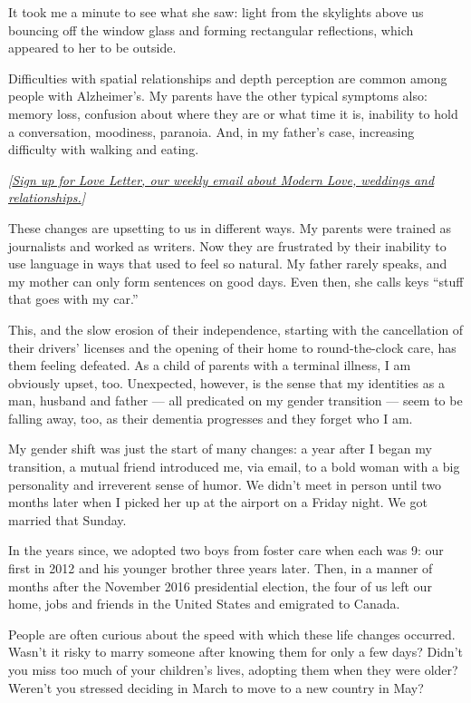It took me a minute to see what she saw: light from the skylights above
us bouncing off the window glass and forming rectangular reflections,
which appeared to her to be outside.

Difficulties with spatial relationships and depth perception are common
among people with Alzheimer's. My parents have the other typical
symptoms also: memory loss, confusion about where they are or what time
it is, inability to hold a conversation, moodiness, paranoia. And, in my
father's case, increasing difficulty with walking and eating.

\emph{{[}}\href{https://www.nytimes3xbfgragh.onion/newsletters/love-letter}{\emph{Sign
up for Love Letter, our weekly email about Modern Love, weddings and
relationships.}}\emph{{]}}

These changes are upsetting to us in different ways. My parents were
trained as journalists and worked as writers. Now they are frustrated by
their inability to use language in ways that used to feel so natural. My
father rarely speaks, and my mother can only form sentences on good
days. Even then, she calls keys ``stuff that goes with my car.''

This, and the slow erosion of their independence, starting with the
cancellation of their drivers' licenses and the opening of their home to
round-the-clock care, has them feeling defeated. As a child of parents
with a terminal illness, I am obviously upset, too. Unexpected, however,
is the sense that my identities as a man, husband and father --- all
predicated on my gender transition --- seem to be falling away, too, as
their dementia progresses and they forget who I am.

My gender shift was just the start of many changes: a year after I began
my transition, a mutual friend introduced me, via email, to a bold woman
with a big personality and irreverent sense of humor. We didn't meet in
person until two months later when I picked her up at the airport on a
Friday night. We got married that Sunday.

In the years since, we adopted two boys from foster care when each was
9: our first in 2012 and his younger brother three years later. Then, in
a manner of months after the November 2016 presidential election, the
four of us left our home, jobs and friends in the United States and
emigrated to Canada.

People are often curious about the speed with which these life changes
occurred. Wasn't it risky to marry someone after knowing them for only a
few days? Didn't you miss too much of your children's lives, adopting
them when they were older? Weren't you stressed deciding in March to
move to a new country in May?

